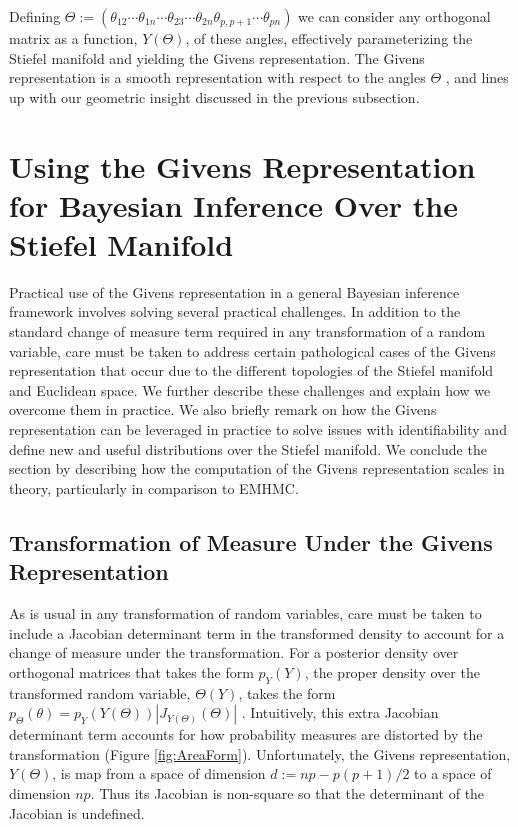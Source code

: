 \documentclass[ba]{imsart}
\numberwithin{equation}{section}
\theoremstyle{plain}
\begin{document}
\noindent Defining $\Theta := (\theta_{12} \cdots \theta_{1n} \cdots \theta_{23} \cdots \theta_{2n} \theta_{p,p+1} \cdots \theta_{pn})$ we can consider any orthogonal matrix as a function, $Y(\Theta)$, of these angles, effectively parameterizing the Stiefel manifold and yielding the Givens representation. The Givens representation is a smooth representation with respect to the angles $\Theta$ \citep{shepard2015representation},  and lines up with our geometric insight discussed in the previous subsection.


\section{Using the Givens Representation for Bayesian Inference Over the Stiefel Manifold} \label{implementation}

Practical use of the Givens representation in a general Bayesian inference framework involves solving several practical challenges. In addition to the standard change of measure term required in any transformation of a random variable, care must be taken to address certain pathological cases of the Givens representation that occur due to the different topologies of the Stiefel manifold and Euclidean space. We further describe these challenges and explain how we overcome them in practice. We also briefly remark on how the Givens representation can be leveraged in practice to solve issues with identifiability and define new and useful distributions over the Stiefel manifold. We conclude the section by describing how the computation of the Givens representation scales in theory, particularly in comparison to EMHMC.

\subsection{Transformation of Measure Under the Givens Representation}\label{measureGivens}
As is usual in any transformation of random variables, care must be taken to include a Jacobian determinant term in the transformed density to account for a change of measure under the transformation. For a posterior density over orthogonal matrices that takes the form $p_Y(Y)$, the proper density over the transformed random variable, $\Theta(Y)$, takes the form $p_\Theta(\theta) = p_{Y}(Y(\Theta)) |J_{Y(\Theta)}(\Theta)|$ \citep{keener2011theoretical}. Intuitively, this extra Jacobian determinant term accounts for how probability measures are distorted by the transformation (Figure \ref{fig:AreaForm}). Unfortunately, the Givens representation, $Y(\Theta)$, is map from a space of dimension $d := np - p(p+1)/2$ to a space of dimension $np$. Thus its Jacobian is non-square so that the determinant of the Jacobian is undefined.
\end{document}
